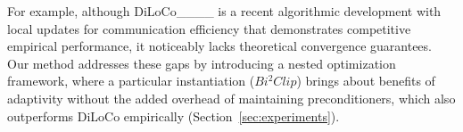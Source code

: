 For example, although DiLoCo____ is a recent algorithmic development with local updates for communication efficiency that demonstrates competitive empirical performance, it noticeably lacks theoretical convergence guarantees. 
Our method addresses these gaps by introducing a nested optimization framework, where a particular instantiation ($Bi^2Clip$) brings about benefits of adaptivity without the added overhead of maintaining preconditioners, which also outperforms DiLoCo empirically (Section~\ref{sec:experiments}). %










\vspace{-1mm}
